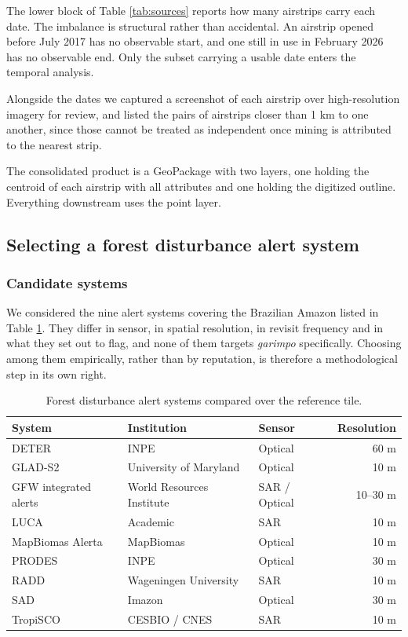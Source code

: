 \documentclass[11pt]{article}
\begin{document}
The lower block of Table \ref{tab:sources} reports how many airstrips carry each date. The imbalance is structural rather than accidental. An airstrip opened before July 2017 has no observable start, and one still in use in February 2026 has no observable end. Only the subset carrying a usable date enters the temporal analysis.

Alongside the dates we captured a screenshot of each airstrip over high-resolution imagery for review, and listed the pairs of airstrips closer than 1 km to one another, since those cannot be treated as independent once mining is attributed to the nearest strip.

The consolidated product is a GeoPackage with two layers, one holding the centroid of each airstrip with all attributes and one holding the digitized outline. Everything downstream uses the point layer.

\subsection{Selecting a forest disturbance alert system}

\subsubsection{Candidate systems}

We considered the nine alert systems covering the Brazilian Amazon listed in Table \ref{tab:alerts}. They differ in sensor, in spatial resolution, in revisit frequency and in what they set out to flag, and none of them targets \textit{garimpo} specifically. Choosing among them empirically, rather than by reputation, is therefore a methodological step in its own right.

\begin{table}[htbp]
\centering
\begin{tabular}{lllr}
\hline
System & Institution & Sensor & Resolution \\
\hline
DETER & INPE & Optical & 60 m \\
GLAD-S2 & University of Maryland & Optical & 10 m \\
GFW integrated alerts & World Resources Institute & SAR / Optical & 10--30 m \\
LUCA & Academic & SAR & 10 m \\
MapBiomas Alerta & MapBiomas & Optical & 10 m \\
PRODES & INPE & Optical & 30 m \\
RADD & Wageningen University & SAR & 10 m \\
SAD & Imazon & Optical & 30 m \\
TropiSCO & CESBIO / CNES & SAR & 10 m \\
\hline
\end{tabular}
\caption{Forest disturbance alert systems compared over the reference tile.}
\label{tab:alerts}
\end{table}
\end{document}
